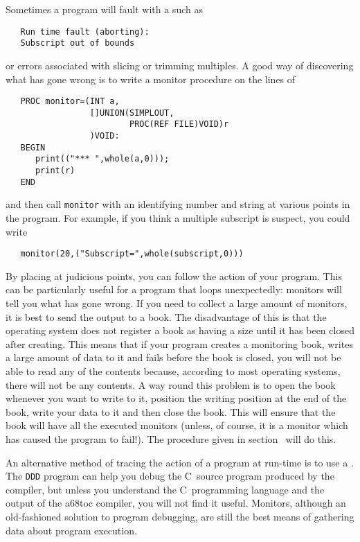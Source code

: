 Sometimes a program will fault with a
 such as
\begin{verbatim}
   Run time fault (aborting):
   Subscript out of bounds
\end{verbatim}
\noindent
or errors associated with slicing or trimming multiples. A good way of
discovering what has gone wrong is to write a monitor procedure on the
lines of
\begin{verbatim}
   PROC monitor=(INT a,
                 []UNION(SIMPLOUT,
                         PROC(REF FILE)VOID)r
                 )VOID:
   BEGIN
      print(("*** ",whole(a,0)));
      print(r)
   END
\end{verbatim}
\noindent
and then call \verb|monitor| with an identifying number and string at
various points in the program. For example, if you think a multiple
subscript is suspect, you could write
\begin{verbatim}
   monitor(20,("Subscript=",whole(subscript,0)))
\end{verbatim}
\noindent
By placing  at judicious points, you can follow
the action of your program. This can be particularly useful for a
program that loops unexpectedly: monitors will tell you what has gone
wrong. If you need to collect a large amount of monitors, it is best to
send the output to a book. The disadvantage of this is that the
operating system does not register a book as having a size until it has
been closed after creating. This means that if your program creates a
monitoring book, writes a large amount of data to it and fails before
the book is closed, you will not be able to read any of the contents
because, according to most operating systems, there will not be any
contents. A way round this problem is to open the book whenever you
want to write to it, position the writing position at the end of the
book, write your data to it and then close the book. This will ensure
that the book will have all the executed monitors (unless, of course,
it is a monitor which has caused the program to fail!). The procedure
 given in section~ will
do this.

An alternative method of tracing the action of a program at run-time
is to use a . The \verb|DDD| program can
help you debug the C~source program produced by the
 compiler, but unless you understand the
C~programming language and the output of the a68toc compiler, you
will not find it useful.  Monitors, although an old-fashioned
solution to program debugging, are still the best means of gathering
data about program execution.

